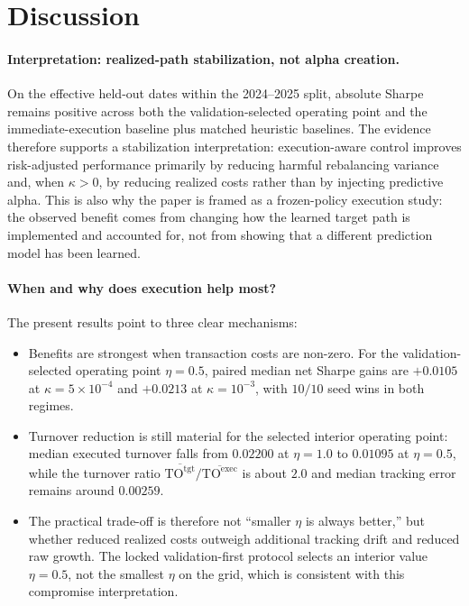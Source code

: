\documentclass[10pt,twocolumn]{article}
\newcommand{\TOexec}{\mathrm{TO}^{\mathrm{exec}}}
\newcommand{\TOtgt}{\mathrm{TO}^{\mathrm{tgt}}}
\newcommand{\kappaTC}{\kappa}
\begin{document}
\section{Discussion}
\paragraph{Interpretation: realized-path stabilization, not alpha creation.}
On the effective held-out dates within the 2024--2025 split, absolute Sharpe remains positive across both the validation-selected operating point and the immediate-execution baseline plus matched heuristic baselines. The evidence therefore supports a stabilization interpretation: execution-aware control improves risk-adjusted performance primarily by reducing harmful rebalancing variance and, when $\kappaTC>0$, by reducing realized costs rather than by injecting predictive alpha. This is also why the paper is framed as a frozen-policy execution study: the observed benefit comes from changing how the learned target path is implemented and accounted for, not from showing that a different prediction model has been learned.

\paragraph{When and why does execution help most?}
The present results point to three clear mechanisms:
\begin{itemize}[leftmargin=*,itemsep=1pt]
\item Benefits are strongest when transaction costs are non-zero. For the validation-selected operating point $\eta=0.5$, paired median net Sharpe gains are $+0.0105$ at $\kappa=5\times10^{-4}$ and $+0.0213$ at $\kappa=10^{-3}$, with $10/10$ seed wins in both regimes.
\item Turnover reduction is still material for the selected interior operating point: median executed turnover falls from $0.02200$ at $\eta=1.0$ to $0.01095$ at $\eta=0.5$, while the turnover ratio $\overline{\TOtgt}/\overline{\TOexec}$ is about $2.0$ and median tracking error remains around $0.00259$.
\item The practical trade-off is therefore not ``smaller $\eta$ is always better,'' but whether reduced realized costs outweigh additional tracking drift and reduced raw growth. The locked validation-first protocol selects an interior value $\eta=0.5$, not the smallest $\eta$ on the grid, which is consistent with this compromise interpretation.
\end{itemize}
\end{document}
